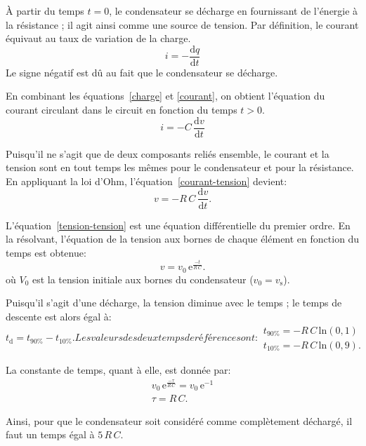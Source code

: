 \documentclass[12pt,oneside,letterpaper]{article}
\begin{document}
À partir du temps $t=0$, le condensateur se décharge en fournissant de l'énergie à la résistance ; il agit ainsi comme une source de tension. Par définition, le courant équivaut au taux de variation de la charge.
\begin{equation}
\label{courant}
i=-\frac{\mathrm{d}q}{\mathrm{d}t}
\end{equation}
Le signe négatif est dû au fait que le condensateur se décharge.

En combinant les équations~\ref{charge} et \ref{courant}, on obtient l'équation du courant circulant dans le circuit en fonction du temps $t>0$.
\begin{equation}
\label{courant-tension}
i=-C\,\frac{\mathrm{d}v}{\mathrm{d}t}
\end{equation}

Puisqu'il ne s'agit que de deux composants reliés ensemble, le courant et la tension sont en tout temps les mêmes pour le condensateur et pour la résistance. En appliquant la loi d'Ohm, l'équation~\ref{courant-tension} devient:
\begin{equation}
\label{tension-tension}
v=-R\,C\,\frac{\mathrm{d}v}{\mathrm{d}t}.
\end{equation}

L'équation~\ref{tension-tension} est une équation différentielle du premier ordre. En la résolvant, l'équation de la tension aux bornes de chaque élément en fonction du temps est obtenue:
\begin{equation}
\label{tension}
v=v_0\,\mathrm{e}^{\frac{-t}{R\,C}}.
\end{equation}
où $V_0$ est la tension initiale aux bornes du condensateur ($v_0=v_{\mathrm{s}}$).

Puisqu'il s'agit d'une décharge, la tension diminue avec le temps ; le temps de descente est alors égal à:
\begin{subequations}
\begin{equation}
t_{\mathrm{d}}=t_{90\%}-t_{10\%}.
\end{equation}
Les valeurs des deux temps de référence sont:
\begin{gather}
t_{90\%}=-R\,C\,\mathrm{ln}\!\left(0,\!1\right)\\
t_{10\%}=-R\,C\,\mathrm{ln}\!\left(0,\!9\right).
\end{gather}
\end{subequations}

La constante de temps, quant à elle, est donnée par:
\begin{subequations}
\begin{gather}
v_0\,\mathrm{e}^{\frac{-\tau}{R\,C}}=v_0\,\mathrm{e}^{-1}\\
\tau=R\,C.
\end{gather}
\end{subequations}

Ainsi, pour que le condensateur soit considéré comme complètement déchargé, il faut un temps égal à $5\,R\,C$.
\end{document}
